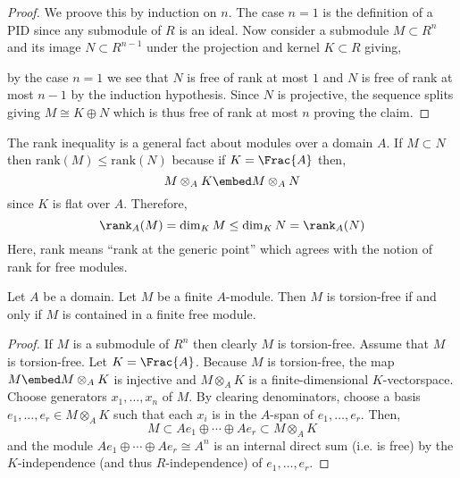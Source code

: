 \documentclass[12pt]{article}
\begin{document}
\begin{proof}
We proove this by induction on $n$. The case $n = 1$ is the definition of a PID since any submodule of $R$ is an ideal. Now consider a submodule $M \subset R^n$ and its image $N \subset R^{n-1}$ under the projection and kernel $K \subset R$ giving,
\begin{center}
\end{center}
by the case $n = 1$ we see that $N$ is free of rank at most $1$ and $N$ is free of rank at most $n - 1$ by the induction hypothesis. Since $N$ is projective, the sequence splits giving $M \cong K \oplus N$ which is thus free of rank at most $n$ proving the claim.
\end{proof}

\begin{rmk}
The rank inequality is a general fact about modules over a domain $A$. If $M \subset N$ then $\mathrm{rank}(M) \le \mathrm{rank}(N)$ because if $K = \Frac{A}$ then,
\[ M \otimes_A K \embed M \otimes_A N \]
since $K$ is flat over $A$. Therefore, 
\[ \rank_{A}(M) = \dim_{K} M \le \dim_K N = \rank_{A}(N) \]
Here, rank means ``rank at the generic point'' which agrees with the notion of rank for free modules.
\end{rmk}

\begin{lemma}
Let $A$ be a domain. Let $M$ be a finite $A$-module. Then $M$ is torsion-free if and only if $M$ is contained in a finite free module.
\end{lemma}

\begin{proof}
If $M$ is a submodule of $R^{n}$ then clearly $M$ is torsion-free. Assume that $M$ is torsion-free. Let $K = \Frac{A}$. Because $M$ is torsion-free, the map $M \embed M \otimes_A K$ is injective and $M \otimes_A K$ is a finite-dimensional $K$-vectorspace. Choose generators $x_1, \dots, x_n$ of $M$. By clearing denominators, choose a basis $e_1, \dots, e_r \in M \otimes_A K$ such that each $x_i$ is in the $A$-span of $e_1, \dots, e_r$. Then,
\[ M \subset A e_1 \oplus \cdots \oplus A e_r \subset M \otimes_A K \]
and the module $A e_1 \oplus \cdots \oplus A e_r \cong A^n$ is an internal direct sum (i.e. is free) by the $K$-independence (and thus $R$-independence) of $e_1, \dots, e_r$.  
\end{proof}
\end{document}
